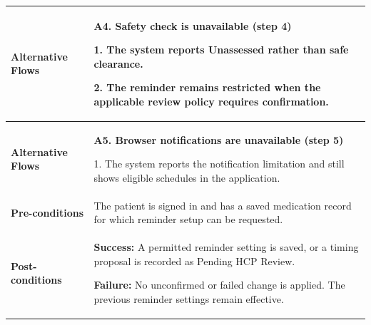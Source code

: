 \begin{longtable}{|p{}|p{}|}
\\ \hline
\textbf{Alternative Flows} &
\textbf{A4. Safety check is unavailable (step 4)}\par
1. The system reports Unassessed rather than safe clearance.\par
2. The reminder remains restricted when the applicable review policy requires confirmation.
\\ \hline
\textbf{Alternative Flows} &
\textbf{A5. Browser notifications are unavailable (step 5)}\par
1. The system reports the notification limitation and still shows eligible schedules in the application.
\\ \hline
\textbf{Pre-conditions} &
The patient is signed in and has a saved
medication record for which reminder setup
can be requested.
 \\ \hline
\textbf{Post-conditions} &
\textbf{Success:} A permitted reminder setting
is saved, or a timing proposal is recorded
as Pending HCP Review.\par
\textbf{Failure:} No unconfirmed or failed change
is applied. The previous reminder settings
remain effective.
\\ \hline
\end{longtable}
\clearpage

